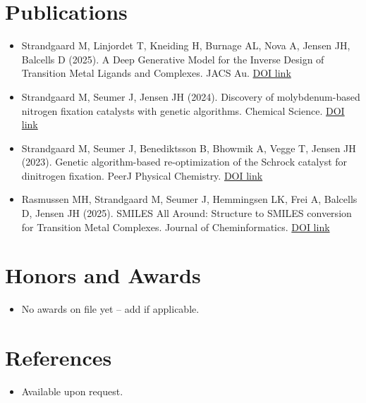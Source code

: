 \documentclass[11pt,a4paper,sans]{moderncv}
\begin{document}
\section{Publications}
\vspace{1pt}
\begin{itemize}
\item Strandgaard M, Linjordet T, Kneiding H, Burnage AL, Nova A, Jensen JH, Balcells D (2025). A Deep Generative Model for the Inverse Design of Transition Metal Ligands and Complexes. JACS Au. \href{https://doi.org/10.1021/jacsau.5c00242}{DOI link}
\item Strandgaard M, Seumer J, Jensen JH (2024). Discovery of molybdenum-based nitrogen fixation catalysts with genetic algorithms. Chemical Science. \href{https://doi.org/10.1039/D4SC02227K}{DOI link}
\item Strandgaard M, Seumer J, Benediktsson B, Bhowmik A, Vegge T, Jensen JH (2023). Genetic algorithm-based re-optimization of the Schrock catalyst for dinitrogen fixation. PeerJ Physical Chemistry. \href{https://doi.org/10.7717/peerj-pchem.30}{DOI link}
\item Rasmussen MH, Strandgaard M, Seumer J, Hemmingsen LK, Frei A, Balcells D, Jensen JH (2025). SMILES All Around: Structure to SMILES conversion for Transition Metal Complexes. Journal of Cheminformatics. \href{https://doi.org/10.1186/s13321-025-01008-1}{DOI link}
\end{itemize}


\section{Honors and Awards}
\vspace{1pt}
\begin{itemize}
\item{No awards on file yet -- add if applicable.}
\end{itemize}


\section{References}
\vspace{1pt}
\begin{itemize}
\item{Available upon request.}
\end{itemize}
\end{document}
